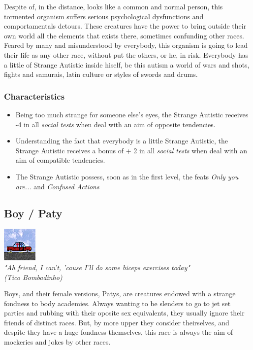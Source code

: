 \documentclass[ letterpaper,12pt]{article}
\begin{document}
Despite of, in the distance, looks like a common and normal person, this
tormented organism suffers serious psychological dysfunctions and
comportamentals detours. These creatures have the power to bring outside their
own world all the elements that exists there, sometimes confunding other races.
Feared by many and misunderstood by everybody, this organism is going to lead
their life as any other race, without put the others, or he, in risk.
Everybody has a little of Strange Autistic inside hiself, be this autism a
world of wars and shots, fights and samurais, latin culture or styles of swords
and drums.

\subsubsection{Characteristics}
\begin{itemize}
\item{Being too much strange for someone else's eyes, the Strange Autistic receives -4 in all {\it social tests} when deal with an aim of opposite tendencies.}
\item{Understanding the fact that everybody is a little Strange Autistic, the Strange Autistic receives a bonus of + 2 in all {\it social tests} when deal with an aim of compatible tendencies.}
\item{The Strange Autistic possess, soon as in the first level, the feats {\it Only you are...} and {\it Confused Actions}}
\end{itemize}

\subsection{Boy / Paty}
\includegraphics{../data/races/Img/boy.png}\\
{\it "Ah friend, I can't, 'cause I'll do some biceps exercises today"\\
(Tico Bombadinho)\\}

Boys, and their female versions, Patys, are creatures endowed with a strange
fondness to body academies. Always wanting to be slenders to go to jet set
parties and rubbing with their oposite sex equivalents, they usually ignore
their friends of distinct races. But, by more upper they consider theirselves,
and despite they have a huge fondness themselves, this race is always the aim
of mockeries and jokes by other races.\\
\end{document}
